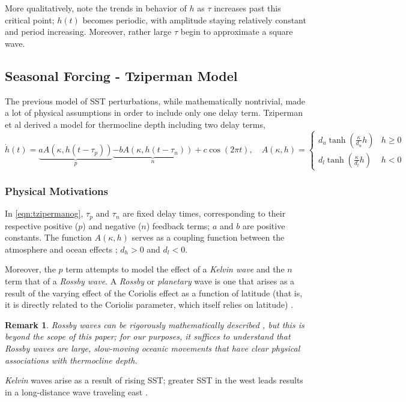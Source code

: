 \documentclass[12pt]{article}
\newtheorem{remark}{Remark}
\begin{document}
More qualitatively, note the trends in behavior of $h$ as $\tau$ increases past this critical point; $h(t)$ becomes periodic, with amplitude staying relatively constant and period increasing. Moreover, rather large $\tau$ begin to approximate a square wave.


\subsection{Seasonal Forcing - Tziperman Model}

The previous model of SST perturbations, while mathematically nontrivial, made a lot of physical assumptions in order to include only one delay term. Tziperman et al \cite{tziperman} derived a model for thermocline depth including two delay terms, 
\begin{equation}\label{eqn:tzipermanog}
    \dot{h}(t) = \underbrace{a A (\kappa, h (t - \tau_p))}_{p} \underbrace{- b A ( \kappa, h (t - \tau_n))}_{n} + c \cos (2 \pi t), \quad A (\kappa, h) = \begin{cases}
        d_u \tanh \left(\frac{\kappa}{d_u}h\right) & h \geq 0\\
        d_l \tanh \left(
            \frac{\kappa}{d_l}h
        \right) & h < 0
    \end{cases}
\end{equation}


\subsubsection{Physical Motivations}


In \cref{eqn:tzipermanog}, $\tau_p$ and $\tau_n$ are fixed delay times, corresponding to their respective positive ($p$) and negative ($n$) feedback terms; $a$ and $b$
are positive constants. The function $A(\kappa, h)$ serves as a coupling function between the atmosphere and ocean effects  \cite{coupling}; $d_h > 0$ and $d_l < 0$. 

Moreover, the $p$ term attempts to model the effect of a \emph{Kelvin wave} and the $n$ term that of a \emph{Rossby wave}. A \emph{Rossby} or \emph{planetary} wave is one that arises as a result of the varying effect of the Coriolis effect as a function of latitude (that is, it is directly related to the Coriolis parameter, which itself relies on latitude)\cite{fundamentalsatmo} \cite{naoorossby}.
\begin{remark}
    Rossby waves can be rigorously mathematically described \cite{fundamentalsatmo}, but this is beyond the scope of this paper; for our purposes, it suffices to understand that Rossby waves are large, slow-moving oceanic movements that have clear physical associations with thermocline depth.
\end{remark}
\emph{Kelvin} waves arise as a result of rising SST; greater SST in the west leads results in a long-distance wave traveling east \cite{climatedde}.
\end{document}
